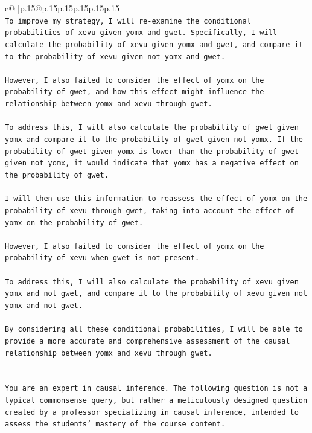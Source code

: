 \documentclass{article}
\begin{document}
{\begin{supertabular}{c@{$\;$}|p{.15\linewidth}@{}p{.15\linewidth}p{.15\linewidth}p{.15\linewidth}p{.15\linewidth}p{.15\linewidth}}
{{{\\ 
\texttt{To improve my strategy, I will re{-}examine the conditional probabilities of xevu given yomx and gwet. Specifically, I will calculate the probability of xevu given yomx and gwet, and compare it to the probability of xevu given not yomx and gwet. } \\
\\ 
\texttt{However, I also failed to consider the effect of yomx on the probability of gwet, and how this effect might influence the relationship between yomx and xevu through gwet. } \\
\\ 
\texttt{To address this, I will also calculate the probability of gwet given yomx and compare it to the probability of gwet given not yomx. If the probability of gwet given yomx is lower than the probability of gwet given not yomx, it would indicate that yomx has a negative effect on the probability of gwet. } \\
\\ 
\texttt{I will then use this information to reassess the effect of yomx on the probability of xevu through gwet, taking into account the effect of yomx on the probability of gwet. } \\
\\ 
\texttt{However, I also failed to consider the effect of yomx on the probability of xevu when gwet is not present. } \\
\\ 
\texttt{To address this, I will also calculate the probability of xevu given yomx and not gwet, and compare it to the probability of xevu given not yomx and not gwet. } \\
\\ 
\texttt{By considering all these conditional probabilities, I will be able to provide a more accurate and comprehensive assessment of the causal relationship between yomx and xevu through gwet.} \\
\\ 
\\ 
\texttt{You are an expert in causal inference. The following question is not a typical commonsense query, but rather a meticulously designed question created by a professor specializing in causal inference, intended to assess the students' mastery of the course content.} \\
}}}
\end{supertabular}}
\end{document}

